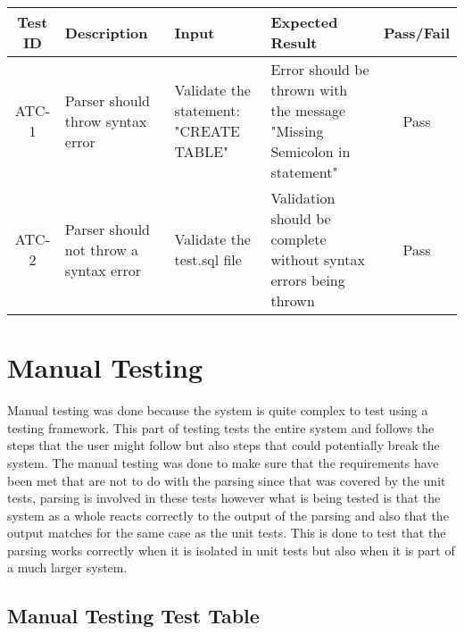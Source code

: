 \begin{center}
	\setlength\extrarowheight{2pt}
	\begin{tabularx}{\textwidth}{|c|X|X|X|c|}
		\hline
		\textbf{Test ID} & \textbf{Description} & \textbf{Input} & \textbf{Expected Result} & \textbf{Pass/Fail} \\
		\hline
		ATC-1 & Parser should throw syntax error & Validate the statement: "CREATE TABLE" & Error should be thrown with the message "Missing Semicolon in statement" & Pass \\
		\hline
		ATC-2 & Parser should not throw a syntax error & Validate the test.sql file & Validation should be complete without syntax errors being thrown & Pass \\
		\hline
	\end{tabularx}
\end{center}

\section{Manual Testing}

Manual testing was done because the system is quite complex to test using a testing framework. This part of testing tests the entire system and follows the steps that the user might follow but also steps that could potentially break the system. The manual testing was done to make sure that the requirements have been met that are not to do with the parsing since that was covered by the unit tests, parsing is involved in these tests however what is being tested is that the system as a whole reacts correctly to the output of the parsing and also that the output matches for the same case as the unit tests. This is done to test that the parsing works correctly when it is isolated in unit tests but also when it is part of a much larger system.

\subsection{Manual Testing Test Table}

